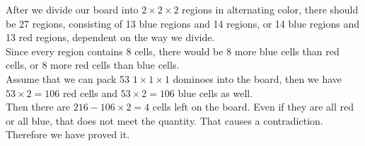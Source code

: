 \documentclass[12pt]{exam}
\begin{document}
\begin{solution}
\begin{qparts}
    \item 
    After we divide our board into $2 \times 2 \times 2$ regions in alternating color, there should be 27 regions, consisting of 13 blue regions and 14 regions, or 14 blue regions and 13 red regions, dependent on the way we divide.\\
    Since every region contains 8 cells, there would be 8 more blue cells than red cells, or 8 more red cells than blue cells.\\
    Assume that we can pack 53 $1 \times 1 \times 1$ dominoes into the board, then we have $53 \times 2 = 106$ red cells and $53 \times 2 = 106$ blue cells as well.\\
    Then there are $216 - 106 \times 2 = 4$ cells left on the board. Even if they are all red or all blue, that does not meet the quantity. That causes a contradiction.\\
    Therefore we have proved it.
    
\end{qparts}
\end{solution}
\end{document}
